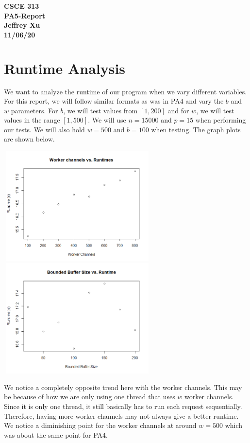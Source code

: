 \documentclass[12pt]{article}
\begin{document}
\begin{center}

{\bf
CSCE 313\\
PA5-Report\\
Jeffrey Xu\\
11/06/20\\
}

\end{center}

\section{Runtime Analysis}

We want to analyze the runtime of our program when we vary different variables. For this report, we will follow similar formats as was in PA4 and vary the $b$ and $w$ parameters. For $b$, we will test values from $[1,200]$ and for $w$, we will test values in the range $[1,500]$. We will use $n=15000$ and $p=15$ when performing our tests. We will also hold $w=500$ and $b=100$ when testing. The graph plots are shown below. 

\begin{center}
\includegraphics[width=8cm, height=6cm]{w_vs_run}
\includegraphics[width=8cm, height=6cm]{b_vs_run}
\end{center}

We notice a completely opposite trend here with the worker channels. This may be because of how we are only using one thread that uses $w$ worker channels. Since it is only one thread, it still basically has to run each request sequentially. Therefore, having more worker channels may not always give a better runtime. We notice a diminishing point for the worker channels at around $w=500$ which was about the same point for PA4. 
\end{document}
